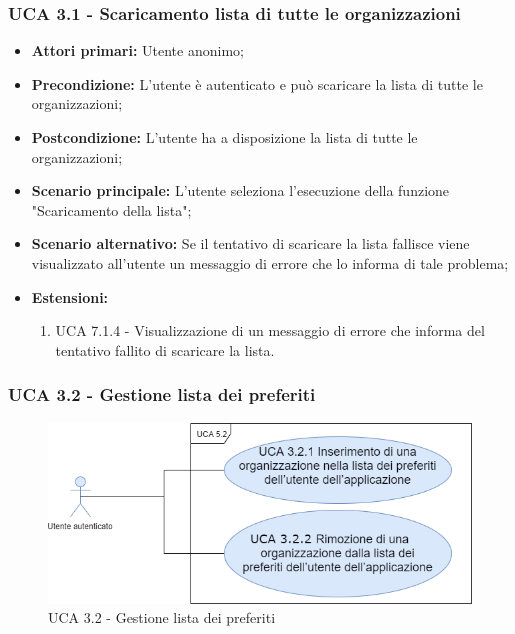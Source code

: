 \subsubsection{UCA 3.1 - Scaricamento lista di tutte le organizzazioni}%
\begin{itemize}
\item \textbf{Attori primari:} Utente anonimo;
\item \textbf{Precondizione:} L'utente è autenticato e può scaricare la lista di tutte le organizzazioni;
\item \textbf{Postcondizione:} L'utente ha a disposizione la lista di tutte le organizzazioni;
\item \textbf{Scenario principale:} L'utente seleziona l'esecuzione della funzione "Scaricamento della lista";
\item \textbf{Scenario alternativo:}  Se il tentativo di scaricare la lista fallisce viene visualizzato all'utente un messaggio di errore che lo informa di tale problema;
\item \textbf{Estensioni:}
	\begin{enumerate}
	\item UCA 7.1.4 - Visualizzazione di un messaggio di errore che informa del tentativo fallito di scaricare la lista.
\end{enumerate}
  
\end{itemize}


\subsubsection{UCA 3.2 - Gestione lista dei preferiti}%

\begin{figure}[h]
	\centering
	
	\includegraphics[scale=0.5]{sezioni/UseCase/Immagini/UCA3.2.png}
	\caption{UCA 3.2 - Gestione lista dei preferiti}
\end{figure}

